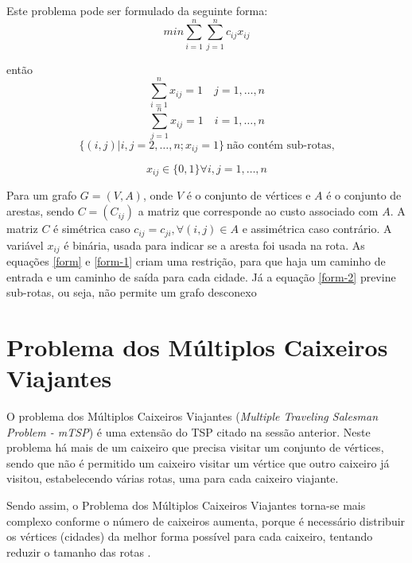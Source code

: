 \documentclass[12pt,openright,a4paper,twoside]{tcc}
\begin{document}
		Este problema pode ser formulado da seguinte forma:
		\begin{equation}
 		   	min\sum_{i=1}^{n} \sum_{j=1}^{n} c_{ij} x_{ij}
		\end{equation}
		
		então		
		\begin{equation}
			\label{form}
 		   	\sum_{i=1}^{n} x_{ij} = 1 \quad j=1,\dots,n
		\end{equation}
		\begin{equation}
			\label{form-1}
 		   	\sum_{j=1}^{n} x_{ij} = 1 \quad i=1,\dots,n
		\end{equation}
		\begin{equation}
		\label{form-2}
 		   	\{(i,j)|i,j=2,\dots,n; x_{ij}=1\} ~\text{não contém sub-rotas,}
		\end{equation}
		
		\begin{equation}
		\label{form-3}
 		   	x_{ij} \in \{0,1\}\forall i,j=1,\dots,n
		\end{equation}
		
			
		Para um grafo  $G=(V,A)$, onde $V$ é o conjunto de vértices e $A$  é o conjunto de arestas, sendo $C = (C_{ij})$ a matriz que corresponde ao custo associado com $A$. A matriz $C$ é simétrica caso $c_{ij}=c_{ji},\forall(i,j) \in A$ e assimétrica caso contrário. A variável $x_{ij}$ é binária, usada para indicar se a aresta foi usada na rota. As equações \ref{form} e \ref{form-1} criam uma restrição, para que haja um caminho de entrada e um caminho de saída para cada cidade. Já a equação \ref{form-2} previne sub-rotas, ou seja, não permite um grafo desconexo \cite{dissertation}
	
	\section{Problema dos Múltiplos Caixeiros Viajantes}

		O problema dos Múltiplos Caixeiros Viajantes (\textit{Multiple Traveling Salesman Problem - mTSP}) é uma extensão do TSP citado na sessão anterior.
		Neste problema há mais de um caixeiro que precisa visitar um conjunto de vértices, sendo que não é permitido um caixeiro visitar um vértice que outro caixeiro já visitou, estabelecendo várias rotas, uma para cada caixeiro viajante.

		Sendo assim, o Problema dos Múltiplos Caixeiros Viajantes torna-se  mais complexo conforme o número de caixeiros aumenta, porque é necessário distribuir os vértices (cidades) da melhor forma possível para cada caixeiro, tentando reduzir o tamanho das rotas \cite{dissertation}. 
\end{document}
